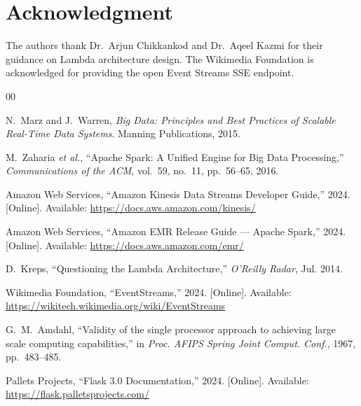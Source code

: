 \documentclass[conference]{IEEEtran}
\begin{document}
\section*{Acknowledgment}

The authors thank Dr.\ Arjun Chikkankod and Dr.\ Aqeel Kazmi for their guidance
on Lambda architecture design. The Wikimedia Foundation is acknowledged for
providing the open Event Streams SSE endpoint.

\begin{thebibliography}{00}

N.~Marz and J.~Warren, \textit{Big Data: Principles and Best Practices of
Scalable Real-Time Data Systems}. Manning Publications, 2015.

M.~Zaharia \textit{et al.}, ``Apache Spark: A Unified Engine for Big Data
Processing,'' \textit{Communications of the ACM}, vol.~59, no.~11,
pp.~56--65, 2016.

Amazon Web Services, ``Amazon Kinesis Data Streams Developer Guide,'' 2024.
[Online]. Available: \url{https://docs.aws.amazon.com/kinesis/}

Amazon Web Services, ``Amazon EMR Release Guide — Apache Spark,'' 2024.
[Online]. Available: \url{https://docs.aws.amazon.com/emr/}

D.~Kreps, ``Questioning the Lambda Architecture,'' \textit{O'Reilly Radar},
Jul. 2014.

Wikimedia Foundation, ``EventStreams,'' 2024. [Online]. Available:
\url{https://wikitech.wikimedia.org/wiki/EventStreams}

G.~M.~Amdahl, ``Validity of the single processor approach to achieving large
scale computing capabilities,'' in \textit{Proc. AFIPS Spring Joint Comput.
Conf.}, 1967, pp.~483--485.

Pallets Projects, ``Flask 3.0 Documentation,'' 2024. [Online]. Available:
\url{https://flask.palletsprojects.com/}

\end{thebibliography}
\end{document}
